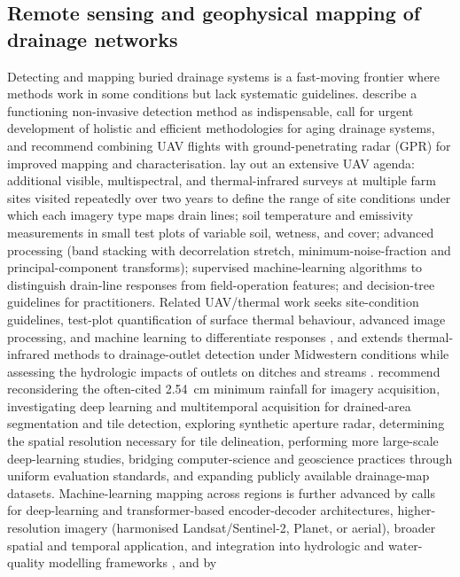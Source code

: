 \subsection{Remote sensing and geophysical mapping of drainage networks}

Detecting and mapping buried drainage systems is a fast-moving frontier where
methods work in some conditions but lack systematic guidelines. \textcite{Wienken2024}
describe a functioning non-invasive detection method as indispensable, call for
urgent development of holistic and efficient methodologies for aging drainage
systems, and recommend combining UAV flights with ground-penetrating radar (GPR)
for improved mapping and characterisation. \textcite{Allred2020} lay out an
extensive UAV agenda: additional visible, multispectral, and thermal-infrared
surveys at multiple farm sites visited repeatedly over two years to define the
range of site conditions under which each imagery type maps drain lines; soil
temperature and emissivity measurements in small test plots of variable soil,
wetness, and cover; advanced processing (band stacking with decorrelation stretch,
minimum-noise-fraction and principal-component transforms); supervised
machine-learning algorithms to distinguish drain-line responses from field-operation
features; and decision-tree guidelines for practitioners. Related UAV/thermal work
seeks site-condition guidelines, test-plot quantification of surface thermal
behaviour, advanced image processing, and machine learning to differentiate
responses \parencite{Allred2021}, and extends thermal-infrared methods
to drainage-outlet detection under Midwestern conditions while assessing the
hydrologic impacts of outlets on ditches and streams \parencite{Allred2022}.
\textcite{Carlsen2024} recommend reconsidering the often-cited 2.54~cm minimum
rainfall for imagery acquisition, investigating deep learning and multitemporal
acquisition for drained-area segmentation and tile detection, exploring synthetic
aperture radar, determining the spatial resolution necessary for tile delineation,
performing more large-scale deep-learning studies, bridging computer-science and
geoscience practices through uniform evaluation standards, and expanding publicly
available drainage-map datasets. Machine-learning mapping across regions is further
advanced by calls for deep-learning and transformer-based encoder-decoder
architectures, higher-resolution imagery (harmonised Landsat/Sentinel-2, Planet,
or aerial), broader spatial and temporal application, and integration into
hydrologic and water-quality modelling frameworks \parencite{Wan2024}, and by
